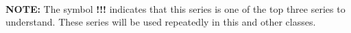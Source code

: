 \documentclass[11pt,fleqn]{article}
\begin{document}
\renewcommand{\headrulewidth}{0pt}
\newcommand{\blank}[1]{\rule{#1}{0.75pt}}
\newcommand{\bc}{\begin{center}}
\newcommand{\ec}{\end{center}}


\vspace*{-0.7in}

\begin{center}
  \large
  \\
   
\end{center}

\textbf{NOTE:} The symbol  \textbf{!!!} indicates that this series is one of the top three series to understand. These series will be used repeatedly in this and other classes.
\end{document}
